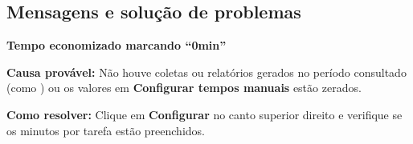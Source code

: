 \subsection*{Mensagens e solução de problemas}

\begin{remark}
\textbf{Tempo economizado marcando ``0min''}\par
\textbf{Causa provável:} Não houve coletas ou relatórios gerados no período consultado (como ) ou os valores em \textbf{Configurar tempos manuais} estão zerados.\par
\textbf{Como resolver:} Clique em \textbf{\faCog{} Configurar} no canto superior direito e verifique se os minutos por tarefa estão preenchidos.
\end{remark}

\fimdecapitulo
